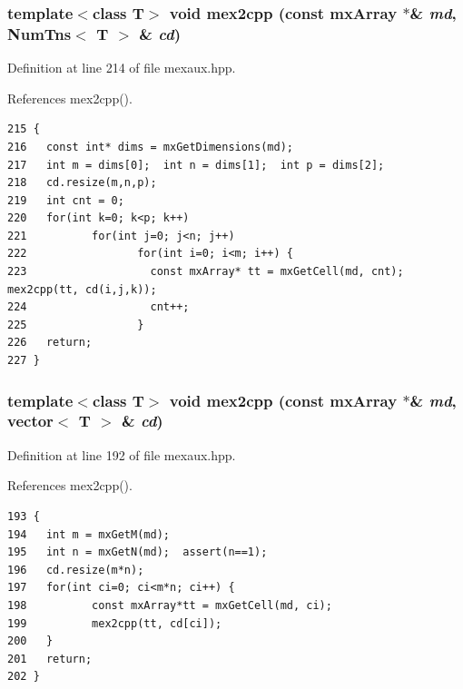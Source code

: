 \subsubsection{\setlength{\rightskip}{0pt plus 5cm}template$<$class T$>$ void mex2cpp (const mx\-Array $\ast$\& {\em md}, Num\-Tns$<$ T $>$ \& {\em cd})\hspace{0.3cm}{\tt  [inline]}}\label{mexaux_8hpp_e5e5c211e304abf05b8d3810b5eb9e27_e5e5c211e304abf05b8d3810b5eb9e27}




Definition at line 214 of file mexaux.hpp.

References mex2cpp().

\footnotesize\begin{verbatim}215 {
216   const int* dims = mxGetDimensions(md);
217   int m = dims[0];  int n = dims[1];  int p = dims[2];
218   cd.resize(m,n,p);
219   int cnt = 0;
220   for(int k=0; k<p; k++)
221          for(int j=0; j<n; j++)
222                 for(int i=0; i<m; i++) {
223                   const mxArray* tt = mxGetCell(md, cnt);                 mex2cpp(tt, cd(i,j,k));
224                   cnt++;
225                 }
226   return;
227 }
\end{verbatim}\normalsize 


\subsubsection{\setlength{\rightskip}{0pt plus 5cm}template$<$class T$>$ void mex2cpp (const mx\-Array $\ast$\& {\em md}, vector$<$ T $>$ \& {\em cd})\hspace{0.3cm}{\tt  [inline]}}\label{mexaux_8hpp_61da90d7d1084271c28270d7fa11089a_61da90d7d1084271c28270d7fa11089a}




Definition at line 192 of file mexaux.hpp.

References mex2cpp().

\footnotesize\begin{verbatim}193 {
194   int m = mxGetM(md);
195   int n = mxGetN(md);  assert(n==1);
196   cd.resize(m*n);
197   for(int ci=0; ci<m*n; ci++) {
198          const mxArray*tt = mxGetCell(md, ci);
199          mex2cpp(tt, cd[ci]);
200   }
201   return;
202 }
\end{verbatim}\normalsize 


